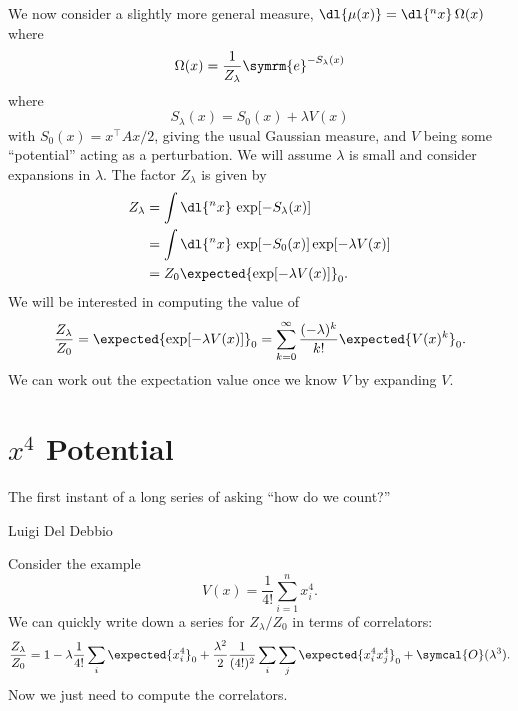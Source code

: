 \documentclass[fleqn]{NotesClass}
\newcommand{\e}{\symrm{e}}
\newcommand{\trans}{{\top}}
\newcommand{\order}{\symcal{O}}
\begin{document}
    We now consider a slightly more general measure, \(\dl{\mu(x)} = \dl{^nx} \,\Omega(x)\) where
    \begin{equation}
        \Omega(x) = \frac{1}{Z_\lambda} \e^{-S_\lambda(x)}
    \end{equation}
    where
    \begin{equation}
        S_\lambda(x) = S_0(x) + \lambda V(x)
    \end{equation}
    with \(S_0(x) = x^\trans Ax/2\), giving the usual Gaussian measure, and \(V\) being some \enquote{potential} acting as a perturbation.
    We will assume \(\lambda\) is small and consider expansions in \(\lambda\).
    The factor \(Z_\lambda\) is given by
    \begin{align}
        Z_\lambda &= \int \dl{^nx}  \, \exp[-S_\lambda(x)]\\
        &= \int \dl{^nx} \, \exp[-S_0(x)]\exp[-\lambda V(x)]\\
        &= Z_0 \expected{\exp[-\lambda V(x)]}_0.
    \end{align}
    We will be interested in computing the value of
    \begin{equation}
        \frac{Z_\lambda}{Z_0} = \expected{\exp[-\lambda V(x)]}_0 = \sum_{k = 0}^{\infty} \frac{(-\lambda)^k}{k!} \expected{V(x)^k}_0.
    \end{equation}
    We can work out the expectation value once we know \(V\) by expanding \(V\).
    
    \section{\texorpdfstring{\(x^4\)}{x to the four} Potential}
    \epigraph{The first instant of a long series of asking \enquote{how do we count?}}{Luigi Del Debbio}
    Consider the example
    \begin{equation}
        V(x) = \frac{1}{4!} \sum_{i = 1}^n x_i^4.
    \end{equation}
    We can quickly write down a series for \(Z_\lambda/Z_0\) in terms of correlators:
    \begin{equation}
        \frac{Z_\lambda}{Z_0} = 1 - \lambda \frac{1}{4!} \sum_i \expected{x_i^4}_0 + \frac{\lambda^2}{2}\frac{1}{(4!)^2} \sum_i \sum_j \expected{x_i^4 x_j^4}_0 + \order(\lambda^3).
    \end{equation}
    Now we just need to compute the correlators.
    
\end{document}
